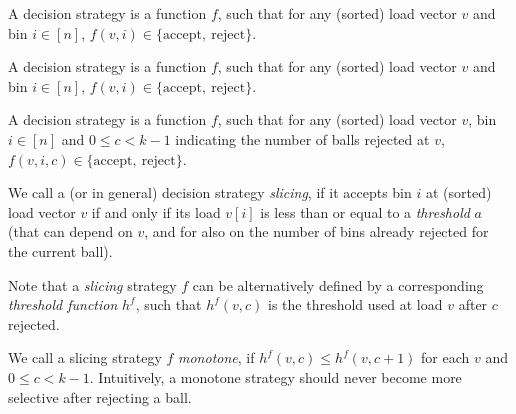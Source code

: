 \begin{definition}
A \TwoThinning decision strategy is a function $f$, such that for any (sorted) load vector $v$ and bin $i\in[n]$, $f(v, i)\in\{\mathrm{accept},\ \mathrm{reject}\}$.
\end{definition}


\begin{definition} 
A \TwoThinning decision strategy is a function $f$, such that for any (sorted) load vector $v$ and bin $i\in[n]$, $f(v, i)\in\{\mathrm{accept},\ \mathrm{reject}\}$.
\end{definition}


\begin{definition} 
A \KThinning decision strategy is a function $f$, such that for any (sorted) load vector $v$, bin $i\in[n]$ and $0\leq c<k-1$ indicating the number of balls rejected at $v$, $f(v, i, c)\in\{\mathrm{accept},\ \mathrm{reject}\}$.
\end{definition}


\begin{definition} 
We call a \TwoThinning (or \KThinning in general) decision strategy \textit{slicing}, if it accepts bin $i$ at (sorted) load vector $v$ if and only if its load $v[i]$ is less than or equal to a \textit{threshold} $a$ (that can depend on $v$, and for \KThinning also on the number of bins already rejected for the current ball). 
\end{definition}


\begin{definition} 
Note that a \KThinning \textit{slicing} strategy $f$ can be alternatively defined by a corresponding \textit{threshold function} $h^f$, such that $h^f(v,c)$ is the threshold used at load $v$ after $c$  rejected.
\end{definition}



\begin{definition} 
We call a \KThinning slicing strategy $f$ \textit{monotone}, if $h^f(v,c)\leq h^f(v,c+1)$ for each $v$ and $0\leq c<k-1$. Intuitively, a monotone strategy should never become more selective after rejecting a ball.
\end{definition}


